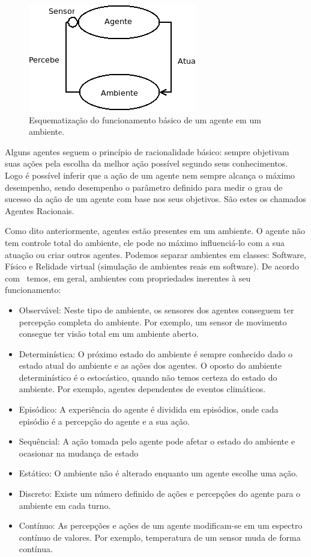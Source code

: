 \begin{figure}
	\centering
	\includegraphics[scale=0.75]{images/agente-basico.png}
	\caption{Esquematização do funcionamento básico de um agente em um ambiente.}
	\label{fig:agente-basico}
\end{figure}

Alguns agentes seguem o princípio de racionalidade básico: sempre objetivam suas ações pela escolha da melhor ação possível segundo seus conhecimentos. Logo é possível inferir que a ação de um agente nem sempre alcança o máximo desempenho, sendo desempenho o parâmetro definido para medir o grau de sucesso da ação de um agente com base nos seus objetivos. São estes os chamados Agentes Racionais.

Como dito anteriormente, agentes estão presentes em um ambiente. O agente não tem controle total do ambiente, ele pode no máximo influenciá-lo com a sua atuação ou criar outros agentes. Podemos separar ambientes em classes: Software, Físico e Relidade virtual (simulação de ambientes reais em software). De acordo com~\cite{wooldridge04} temos, em geral, ambientes com propriedades inerentes à seu funcionamento:

\begin{itemize}
	\item Observável: Neste tipo de ambiente, os sensores dos agentes conseguem ter percepção completa do ambiente. Por exemplo, um sensor de movimento consegue ter visão total em um ambiente aberto.
	\item Determinística: O próximo estado do ambiente é sempre conhecido dado o estado atual do ambiente e as ações dos agentes. O oposto do ambiente determinístico é o estocástico, quando não temos certeza do estado do ambiente. Por exemplo, agentes dependentes de eventos climáticos.
	\item Episódico: A experiência do agente é dividida em episódios, onde cada episódio é a percepção do agente e a sua ação.
	\item Sequêncial: A ação tomada pelo agente pode afetar o estado do ambiente e ocasionar na mudança de estado
	\item Estático: O ambiente não é alterado enquanto um agente escolhe uma ação.
	\item Discreto: Existe um número definido de ações e percepções do agente para o ambiente em cada turno.
	\item Contínuo: As percepções e ações de um agente modificam-se em um espectro contínuo de valores. Por exemplo, temperatura de um sensor muda de forma contínua.
\end{itemize}

